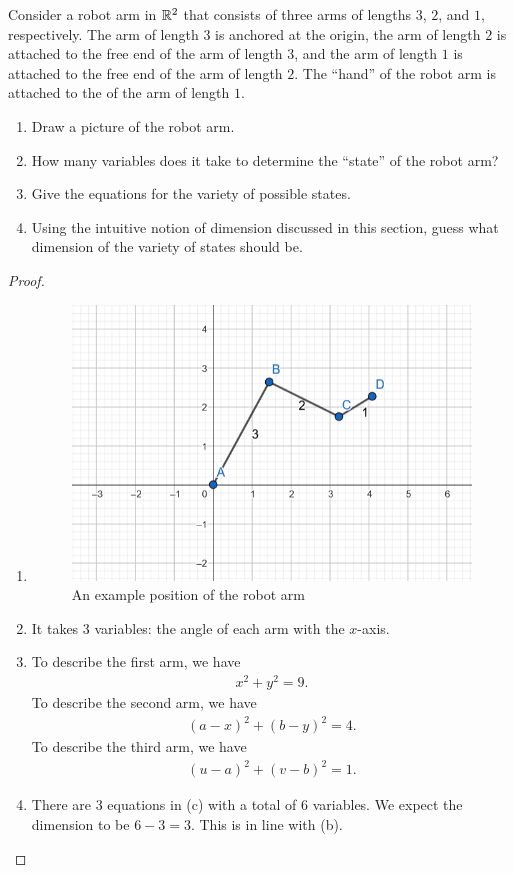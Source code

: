 \begin{exercise}{13}
Consider a robot arm in $\mathbb{R}^2$ that consists of three arms of lengths $3$, $2$, and $1$, respectively. 
The arm of length $3$ is anchored at the origin, the arm of length $2$ is attached to the free end of the arm of length $3$, and the arm of length $1$ is attached to the free end of the arm of length $2$. 
The ``hand'' of the robot arm is attached to the of the arm of length $1$.
\begin{enumerate}
    \item Draw a picture of the robot arm.
    \item How many variables does it take to determine the ``state'' of the robot arm?
    \item Give the equations for the variety of possible states.
    \item Using the intuitive notion of dimension discussed in this section, guess what dimension of the variety of states should be.
\end{enumerate}
\end{exercise}
\begin{proof}
    \begin{enumerate}
        \item 
\begin{figure}[H]
        \centering
        \includegraphics[width=0.5\linewidth]{cox-little-oshea/ch1/assets/sec1-2-ex13.png}
        \caption{An example position of the robot arm}
        \label{fig:sec1-2-ex13}
    \end{figure}
    \item It takes $3$ variables: 
    the angle of each arm with the $x$-axis.
    \item To describe the first arm, we have
    \begin{align*}
        x^2 + y^2 = 9.
    \end{align*}
    To describe the second arm, we have
    \begin{align*}
        (a-x)^2 + (b-y)^2 = 4.
    \end{align*}    
    To describe the third arm, we have
    \begin{align*}
        (u-a)^2 + (v-b)^2 = 1.
    \end{align*}
    \item There are $3$ equations in (c) with a total of $6$ variables. 
    We expect the dimension to be $6-3 = 3$. 
    This is in line with (b).
\end{enumerate}
\end{proof}

